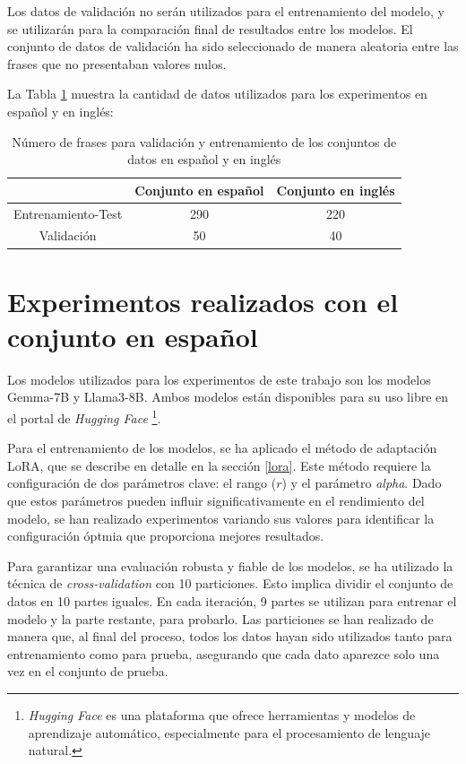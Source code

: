 \documentclass[11pt,spanish,listoffigures,listoftables]{tfgetsinf}
\begin{document}
Los datos de validación no serán utilizados para el entrenamiento del modelo, y se utilizarán para la comparación final de resultados entre los modelos. El conjunto de datos de validación ha sido seleccionado de manera aleatoria entre las frases que no presentaban valores nulos.

La Tabla \ref{tab:frases} muestra la cantidad de datos utilizados para los experimentos en español y en inglés:

\begin{table}[!h]
\caption{Número de frases para validación y entrenamiento de los conjuntos de datos en español y en inglés}
\begin{center}
\begin{tabular}{  c || c  c  }
	\ & Conjunto en español & Conjunto en inglés \\
	\hline
	Entrenamiento-Test & 290 & 220 \\
	Validación & 50 & 40
\end{tabular}
\end{center}
\label{tab:frases}
\end{table}

\section{Experimentos realizados con el conjunto en español}

Los modelos utilizados para los experimentos de este trabajo son los modelos Gemma-7B y Llama3-8B. Ambos modelos están disponibles para su uso libre en el portal de \textit{Hugging Face} \footnote{\textit{Hugging Face} es una plataforma que ofrece herramientas y modelos de aprendizaje automático, especialmente para el procesamiento de lenguaje natural.}.

Para el entrenamiento de los modelos, se ha  aplicado el método de adaptación LoRA, que se describe en detalle en la sección \ref{lora}. Este método requiere la configuración de dos parámetros clave: el rango ($r$) y el parámetro \textit{alpha}. Dado que estos parámetros pueden influir significativamente en el rendimiento del modelo, se han realizado experimentos variando sus valores para identificar la configuración óptmia que proporciona mejores resultados.

Para garantizar una evaluación robusta y fiable de los modelos, se ha utilizado la técnica de \textit{cross-validation} con 10 particiones. Esto implica dividir el conjunto de datos en 10 partes iguales. En cada iteración, 9 partes se utilizan para entrenar el modelo y la parte restante, para probarlo. Las particiones se han realizado de manera que, al final del proceso, todos los datos hayan sido utilizados tanto para entrenamiento como para prueba, asegurando que cada dato aparezce solo una vez en el conjunto de prueba.
\end{document}
